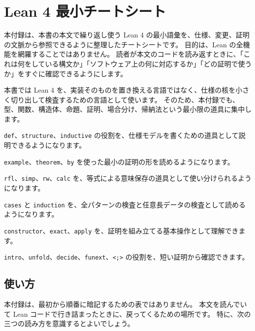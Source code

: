 \chapter{Lean 4 最小チートシート}
\label{chap:appA-lean4-min-cheatsheet}

\begin{chapterabstract}
本付録は、本書の本文で繰り返し使う Lean 4 の最小語彙を、仕様、変更、証明の文脈から参照できるように整理したチートシートです。
目的は、Lean の全機能を網羅することではありません。
読者が本文のコードを読み返すときに、「これは何をしている構文か」「ソフトウェア上の何に対応するか」「どの証明で使うか」をすぐに確認できるようにします。

本書では Lean 4 を、実装そのものを置き換える言語ではなく、仕様の核を小さく切り出して検査するための言語として使います。
そのため、本付録でも、型、関数、構造体、命題、証明、場合分け、帰納法という最小限の道具に集中します。
\end{chapterabstract}

\begin{learninggoals}
\item \texttt{def}、\texttt{structure}、\texttt{inductive} の役割を、仕様モデルを書くための道具として説明できるようになります。
\item \texttt{example}、\texttt{theorem}、\texttt{by} を使った最小の証明の形を読めるようになります。
\item \texttt{rfl}、\texttt{simp}、\texttt{rw}、\texttt{calc} を、等式による意味保存の道具として使い分けられるようになります。
\item \texttt{cases} と \texttt{induction} を、全パターンの検査と任意長データの検査として読めるようになります。
\item \texttt{constructor}、\texttt{exact}、\texttt{apply} を、証明を組み立てる基本操作として理解できます。
\item \texttt{intro}、\texttt{unfold}、\texttt{decide}、\texttt{funext}、\texttt{<;>} の役割を、短い証明から確認できます。
\end{learninggoals}

\section{使い方}

本付録は、最初から順番に暗記するための表ではありません。
本文を読んでいて Lean コードで行き詰まったときに、戻ってくるための場所です。
特に、次の三つの読み方を意識するとよいでしょう。

